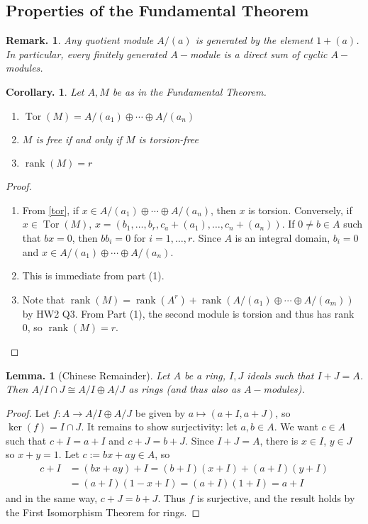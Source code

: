 \documentclass[11pt, a4paper]{memoir}
\theoremstyle{change}
\newtheorem{lemma}[theorem]{Lemma.}
\newtheorem{corollary}[theorem]{Corollary.}
\theoremstyle{plain}
\theoremstyle{nonumberplain}
\newtheorem{remark}{Remark.}
\newtheorem{proof}{Proof}
\DeclareMathOperator{\rank}{rank}
\DeclareMathOperator{\Tor}{Tor}
\numberwithin{equation}{section}
\begin{document}
\subsection{Properties of the Fundamental Theorem}
\begin{remark}
    Any quotient module $A/(a)$ is generated by the element $1+(a)$.
    In particular, every finitely generated $A-$module is a direct sum of cyclic $A-$modules.
\end{remark}
\begin{corollary}
    Let $A,M$ be as in the Fundamental Theorem.
    \begin{enumerate}[nolistsep]
        \item $\Tor(M)=A/(a_1)\oplus\cdots\oplus A/(a_n)$
        \item $M$ is free if and only if $M$ is torsion-free
        \item $\rank(M)=r$
    \end{enumerate}
\end{corollary}
\begin{proof}
    \begin{enumerate}[nolistsep]
        \item From \cref{tor}, if $x\in A/(a_1)\oplus\cdots\oplus A/(a_n)$, then $x$ is torsion.
            Conversely, if $x\in\Tor(M)$, $x=(b_1,\ldots,b_r,c_a+(a_1),\ldots,c_n+(a_n))$.
            If $0\neq b\in A$ such that $bx=0$, then $bb_i=0$ for $i=1,\ldots,r$.
            Since $A$ is an integral domain, $b_i=0$ and $x\in A/(a_1)\oplus\cdots\oplus A/(a_n)$.
        \item This is immediate from part (1).
        \item Note that $\rank(M)=\rank(A^r)+\rank(A/(a_1)\oplus \cdots\oplus A/(a_m))$ by HW2 Q3.
            From Part (1), the second module is torsion and thus has rank 0, so $\rank(M)=r$.
    \end{enumerate}
\end{proof}
\begin{lemma}[Chinese Remainder]
    Let $A$ be a ring, $I,J$ ideals such that $I+J=A$.
    Then $A/I\cap J\cong A/I\oplus A/J$ as rings (and thus also as $A-$modules).
\end{lemma}
\begin{proof}
    Let $f:A\to A/I\oplus A/J$ be given by $a\mapsto(a+I,a+J)$, so $\ker(f)=I\cap J$.
    It remains to show surjectivity: let $a,b\in A$.
    We want $c\in A$ such that $c+I=a+I$ and $c+J=b+J$.
    Since $I+J=A$, there is $x\in I$, $y\in J$ so $x+y=1$.
    Let $c:=bx+ay\in A$, so
    \begin{align*}
        c+I &= (bx+ay)+I =(b+I)(x+I)+(a+I)(y+I)\\
            &= (a+I)(1-x+I)= (a+I)(1+I)= a+I
    \end{align*}
    and in the same way, $c+J=b+J$.
    Thus $f$ is surjective, and the result holds by the First Isomorphism Theorem for rings.
\end{proof}
\end{document}
